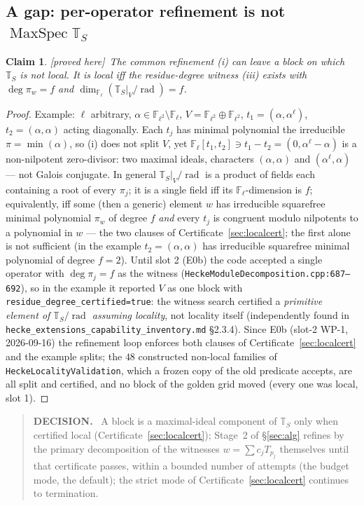 \documentclass[11pt]{article}
\newtheorem{claim}[theorem]{Claim}
\theoremstyle{remark}
\newcommand{\F}{\mathbb{F}}
\newcommand{\Fl}{\F_\ell}
\DeclareMathOperator{\rad}{rad}
\DeclareMathOperator{\MaxSpec}{MaxSpec}
\newcommand{\T}{\mathbb{T}}
\newcommand{\PROVED}{\textsf{[proved here]}}
\newenvironment{decisionbox}
  {\par\medskip\noindent\begin{quote}\textbf{DECISION.}\ }
  {\end{quote}\medskip}
\begin{document}
\subsection{A gap: per-operator refinement is not \texorpdfstring{$\MaxSpec\T_S$}{MaxSpec T\_S}}\label{sec:gap}
\begin{claim}\label{cl:gap}\PROVED\
The common refinement (i) can leave a block on which $\T_S$ is \emph{not} local. It is local iff
the residue-degree witness (iii) exists with $\deg\pi_w=f$ \emph{and} $\dim_{\Fl}(\T_S|_V/\rad)=f$.
\end{claim}
\begin{proof}
Example: $\ell$ arbitrary, $\alpha\in\F_{\ell^2}\setminus\Fl$, $V=\F_{\ell^2}\oplus\F_{\ell^2}$,
$t_1=(\alpha,\alpha^\ell)$, $t_2=(\alpha,\alpha)$ acting diagonally. Each $t_j$ has minimal
polynomial the irreducible $\pi=\min(\alpha)$, so (i) does not split $V$, yet
$\Fl[t_1,t_2]\ni t_1-t_2=(0,\alpha^\ell-\alpha)$ is a non-nilpotent zero-divisor: two maximal
ideals, characters $(\alpha,\alpha)$ and $(\alpha^\ell,\alpha)$ --- not Galois conjugate. In
general $\T_S|_V/\rad$ is a product of fields each containing a root of every $\pi_j$; it is a
single field iff its $\Fl$-dimension is $f$; equivalently, iff some (then a generic) element
$w$ has irreducible squarefree minimal polynomial $\pi_w$ of degree $f$ \emph{and} every $t_j$ is
congruent modulo nilpotents to a polynomial in $w$ --- the two clauses of
Certificate~\ref{sec:localcert}; the first alone is not sufficient (in the example
$t_2=(\alpha,\alpha)$ has irreducible squarefree minimal polynomial of degree $f=2$). Until
slot 2 (E0b) the code accepted a single
operator with $\deg\pi_j=f$ as the witness (\texttt{HeckeModuleDecomposition.cpp:687--692}), so in
the example it reported $V$ as one block with \texttt{residue\_degree\_certified=true}: the witness
search certified a \emph{primitive element of $\T_S/\rad$ assuming locality}, not locality itself
(independently found in \texttt{hecke\_extensions\_capability\_inventory.md} \S2.3.4). Since E0b
(slot-2 WP-1, 2026-09-16) the refinement loop enforces both clauses of
Certificate~\ref{sec:localcert} and the example splits; the $48$ constructed non-local families
of \texttt{HeckeLocalityValidation}, which a frozen copy of the old predicate accepts, are all
split and certified, and no block of the golden grid moved (every one was local, slot 1).
\end{proof}

\begin{decisionbox}
A block is a maximal-ideal component of $\T_S$ only when certified local
(Certificate~\ref{sec:localcert}); Stage~2 of \S\ref{sec:alg} refines by the primary
decomposition of the witnesses $w=\sum c_jT_{p_j}$ themselves until that certificate passes,
within a bounded number of attempts (the budget mode, the default); the strict mode of
Certificate~\ref{sec:localcert} continues to termination.
\end{decisionbox}
\end{document}
